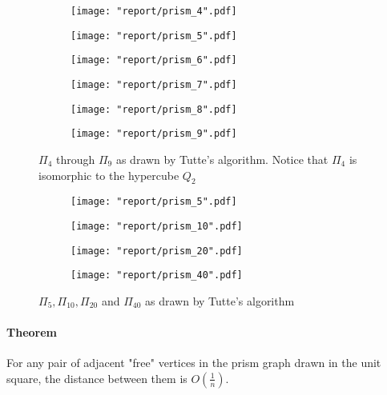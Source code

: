 \documentclass[11pt]{article}
\begin{document}
\begin{figure}[H]
    \begin{subfigure}{.3\textwidth}
        \texttt{[image: "report/prism\_4".pdf]}
    \end{subfigure}
    \begin{subfigure}{.3\textwidth}
        \texttt{[image: "report/prism\_5".pdf]}
    \end{subfigure}
    \begin{subfigure}{.3\textwidth}
        \texttt{[image: "report/prism\_6".pdf]}
    \end{subfigure}
    \begin{subfigure}{.3\textwidth}
        \texttt{[image: "report/prism\_7".pdf]}
    \end{subfigure}
    \begin{subfigure}{.3\textwidth}
        \texttt{[image: "report/prism\_8".pdf]}
    \end{subfigure}
    \begin{subfigure}{.3\textwidth}
        \texttt{[image: "report/prism\_9".pdf]}
    \end{subfigure}
\caption{$\Pi_4$ through $\Pi_{9}$ as drawn by Tutte's algorithm. Notice that $\Pi_4$ is isomorphic to the hypercube $Q_2$}
\end{figure}

\begin{figure}[H]
    \begin{subfigure}{.5\textwidth}
        \texttt{[image: "report/prism\_5".pdf]}
    \end{subfigure}
    \begin{subfigure}{.5\textwidth}
        \texttt{[image: "report/prism\_10".pdf]}
    \end{subfigure}
    \begin{subfigure}{.5\textwidth}
        \texttt{[image: "report/prism\_20".pdf]}
    \end{subfigure}
    \begin{subfigure}{.5\textwidth}
        \texttt{[image: "report/prism\_40".pdf]}
    \end{subfigure}
    \caption{$\Pi_5, \Pi_{10}, \Pi_{20}$ and $\Pi_{40}$ as drawn by Tutte's algorithm}
\end{figure}

\paragraph{Theorem} For any pair of adjacent "free" vertices in the prism graph drawn in the unit square, the distance between them is $O(\frac{1}{n})$.
\end{document}
